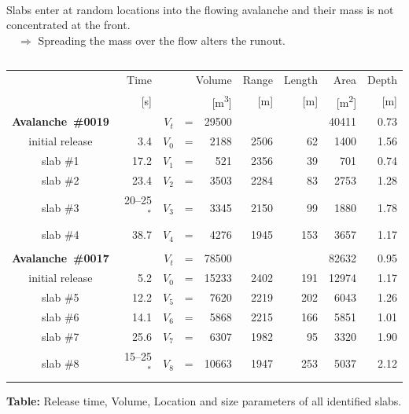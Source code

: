 \documentclass[unknownkeysallowed,usepdftitle=false]{beamer}
\begin{document}
\begin{frame}\label{slabtable}
\begin{columns}
\begin{column}[t]{1.1\textwidth}
\hyperlink{slab}{}\\
Slabs enter at random locations into the flowing avalanche and their mass is not
concentrated at the front.\\
$\quad \Rightarrow$ Spreading the mass over the flow alters the runout.
\vspace{0.3cm}
\end{column}
\end{columns}
 \begin{tabular}{c|rr@{}c@{}rrrrr}
 \setlength{\tabcolsep}{6mm}
   & Time & \multicolumn{3}{r}{Volume} & Range & Length & Area & Depth \\
   & [\si{\second}] & \multicolumn{3}{r}{[\si{\cubic\metre}]} & [\si{\metre}] &
[\si{\metre}] & [\si{\square\metre}] & [\si{\metre}]\\\hline

   \textbf{Avalanche~\#0019} & & $V_t$ &=& 29500 & & & 40411 & 0.73 \\
   initial release &3.4& $V_0$ &=& 2188 & 2506 &  62 &  1400 & 1.56 \\
   slab \#1 & 17.2    &  $V_1$ &=&  521 & 2356 &  39 &   701 & 0.74 \\
   slab \#2 & 23.4    &  $V_2$ &=& 3503 & 2284 &  83 &  2753 & 1.28 \\
   slab \#3 & 20--25$^*$ &  $V_3$ &=& 3345 & 2150 &  99 &  1880 & 1.78 \\
   slab \#4 & 38.7    &  $V_4$ &=& 4276 & 1945 & 153 &  3657 & 1.17 \\
   \\
   \textbf{Avalanche~\#0017} & &  $V_t$ &=& 78500 & & & 82632 & 0.95\\
   initial release&5.2&  $V_0$ &=& 15233 & 2402 & 191 & 12974 & 1.17\\
   slab \#5 & 12.2    &  $V_5$ &=&  7620 & 2219 & 202 &  6043 & 1.26 \\
   slab \#6 & 14.1    &  $V_6$ &=&  5868 & 2215 & 166 &  5851 & 1.01 \\
   slab \#7 & 25.6    &  $V_7$ &=&  6307 & 1982 &  95 &  3320 & 1.90 \\
   slab \#8 & 15--25$^*$ &  $V_8$ &=& 10663 & 1947 & 253 &  5037 & 2.12
 \end{tabular}
 
\vspace{0.2cm}
 \textbf{Table:} Release time, Volume, Location and size parameters of all
identified slabs.

\end{frame}
\end{document}
